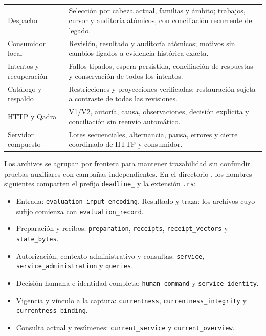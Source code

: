 \begin{longtable}{@{}L{3.8cm}L{\dimexpr\linewidth-3.8cm-2\tabcolsep\relax}@{}}
    Despacho & Selección por cabeza actual, familias y ámbito; trabajos, cursor y auditoría atómicos, con conciliación recurrente del legado. \\
    Consumidor local & Revisión, resultado y auditoría atómicos; motivos sin cambios ligados a evidencia histórica exacta. \\
    Intentos y recuperación & Fallos tipados, espera persistida, conciliación de respuestas y conservación de todos los intentos. \\
    Catálogo y respaldo & Restricciones y proyecciones verificadas; restauración sujeta a contraste de todas las revisiones. \\
    HTTP y Qadra & V1/V2, autoría, causa, observaciones, decisión explícita y conciliación sin reenvío automático. \\
    Servidor compuesto & Lotes secuenciales, alternancia, pausa, errores y cierre coordinado de HTTP y consumidor. \\
\end{longtable}

\begingroup
\raggedright
Los archivos se agrupan por frontera para mantener trazabilidad sin confundir pruebas auxiliares con campañas independientes. En el directorio , los nombres siguientes comparten el prefijo \texttt{deadline\_} y la extensión \texttt{.rs}:
\begin{itemize}
  \item Entrada: \texttt{evaluation\_input\_encoding}. Resultado y traza: los archivos cuyo sufijo comienza con \texttt{evaluation\_record}.
  \item Preparación y recibos: \texttt{preparation}, \texttt{receipts}, \texttt{receipt\_vectors} y \texttt{state\_bytes}.
  \item Autorización, contexto administrativo y consultas: \texttt{service}, \texttt{service\_administration} y \texttt{queries}.
  \item Decisión humana e identidad completa: \texttt{human\_command} y \texttt{service\_identity}.
  \item Vigencia y vínculo a la captura: \texttt{currentness}, \texttt{currentness\_integrity} y \texttt{currentness\_binding}.
  \item Consulta actual y resúmenes: \texttt{current\_service} y \texttt{current\_overview}.
\end{itemize}

